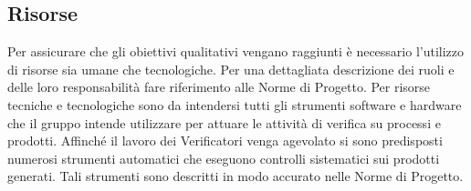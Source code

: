 \subsection{Risorse}{
Per assicurare che gli obiettivi qualitativi vengano raggiunti è necessario l’utilizzo di risorse sia umane che tecnologiche. Per una dettagliata descrizione dei ruoli e delle loro responsabilità fare riferimento alle Norme di Progetto. Per risorse tecniche e tecnologiche sono da intendersi tutti gli strumenti software e hardware che il gruppo intende utilizzare per attuare le attività di verifica su processi e prodotti. Affinché il lavoro dei Verificatori venga agevolato si sono predisposti numerosi strumenti automatici che eseguono controlli sistematici sui prodotti generati. Tali strumenti sono descritti in modo accurato nelle Norme di Progetto.
}